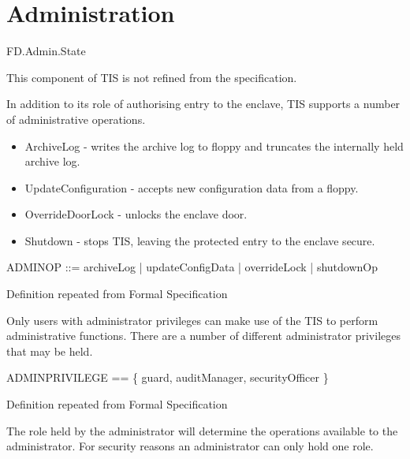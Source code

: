 \section{Administration}

\begin{traceunit}{FD.Admin.State}
\end{traceunit}

This component of TIS is not refined from the specification.

In addition to its role of authorising entry to the enclave, TIS 
supports a number of administrative operations. 

\begin{itemize}
\item ArchiveLog - writes the archive log to floppy and truncates the
internally held archive log.
\item UpdateConfiguration - accepts new configuration data from a floppy. 
\item OverrideDoorLock - unlocks the enclave door. 
\item Shutdown - stops TIS, leaving the protected entry to the enclave secure.
\end{itemize}

\begin{syntax}
        ADMINOP ::=  archiveLog | updateConfigData |
        overrideLock | shutdownOp 
\end{syntax}
\begin{Zcomment}
\item Definition repeated from Formal Specification \cite{FS}
\end{Zcomment}

Only users with administrator privileges can make use of the TIS to
perform administrative functions. There are a number of different
administrator privileges that may be held.

\begin{zed}
        ADMINPRIVILEGE == \{ guard, auditManager, securityOfficer \}
\end{zed}
\begin{Zcomment}
\item Definition repeated from Formal Specification \cite{FS}
\end{Zcomment}

The role held by the administrator will determine the operations
available to the administrator. For security reasons an administrator
can only hold one role.

